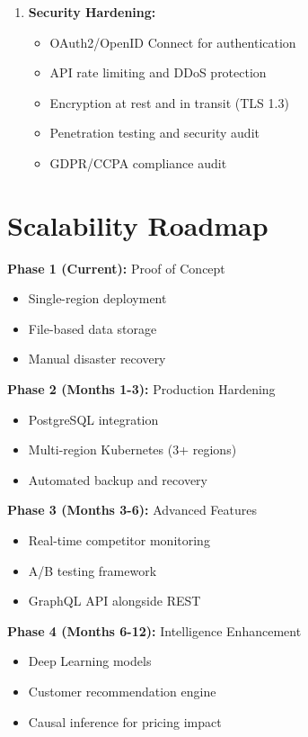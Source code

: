 \documentclass[12pt,a4paper]{report}
\begin{document}
\begin{enumerate}[leftmargin=2em]
    \item \textbf{Security Hardening:}
    \begin{itemize}
        \item OAuth2/OpenID Connect for authentication
        \item API rate limiting and DDoS protection
        \item Encryption at rest and in transit (TLS 1.3)
        \item Penetration testing and security audit
        \item GDPR/CCPA compliance audit
    \end{itemize}
\end{enumerate}

\section{Scalability Roadmap}

\textbf{Phase 1 (Current):} Proof of Concept
\begin{itemize}[leftmargin=2em]
    \item Single-region deployment
    \item File-based data storage
    \item Manual disaster recovery
\end{itemize}

\textbf{Phase 2 (Months 1-3):} Production Hardening
\begin{itemize}[leftmargin=2em]
    \item PostgreSQL integration
    \item Multi-region Kubernetes (3+ regions)
    \item Automated backup and recovery
\end{itemize}

\textbf{Phase 3 (Months 3-6):} Advanced Features
\begin{itemize}[leftmargin=2em]
    \item Real-time competitor monitoring
    \item A/B testing framework
    \item GraphQL API alongside REST
\end{itemize}

\textbf{Phase 4 (Months 6-12):} Intelligence Enhancement
\begin{itemize}[leftmargin=2em]
    \item Deep Learning models
    \item Customer recommendation engine
    \item Causal inference for pricing impact
\end{itemize}
\end{document}
